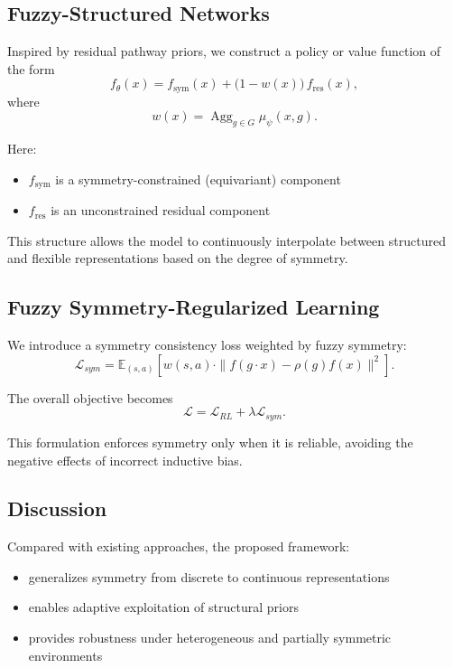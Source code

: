 \subsection{Fuzzy-Structured Networks}

Inspired by residual pathway priors, we construct a policy or value function of the form
\begin{equation}
f_\theta(x) =
f_{\text{sym}}(x)
+
\big(1 - w(x)\big)\, f_{\text{res}}(x),
\end{equation}
where
\begin{equation}
w(x) = \operatorname{Agg}_{g \in G} \mu_\psi(x,g).
\end{equation}

Here:
\begin{itemize}
\item $f_{\text{sym}}$ is a symmetry-constrained (equivariant) component
\item $f_{\text{res}}$ is an unconstrained residual component
\end{itemize}

This structure allows the model to continuously interpolate between structured and flexible representations based on the degree of symmetry.

\subsection{Fuzzy Symmetry-Regularized Learning}

We introduce a symmetry consistency loss weighted by fuzzy symmetry:
\begin{equation}
\mathcal{L}_{sym} =
\mathbb{E}_{(s,a)} \left[
w(s,a) \cdot
\| f(g \cdot x) - \rho(g)f(x) \|^2
\right].
\end{equation}

The overall objective becomes
\begin{equation}
\mathcal{L} = \mathcal{L}_{RL} + \lambda \mathcal{L}_{sym}.
\end{equation}

This formulation enforces symmetry only when it is reliable, avoiding the negative effects of incorrect inductive bias.

\subsection{Discussion}

Compared with existing approaches, the proposed framework:
\begin{itemize}
\item generalizes symmetry from discrete to continuous representations
\item enables adaptive exploitation of structural priors
\item provides robustness under heterogeneous and partially symmetric environments
\end{itemize}


